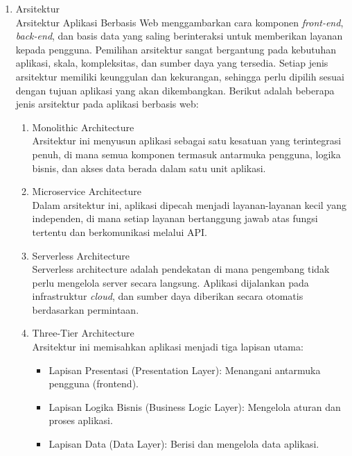 \begin{enumerate}[label*=\arabic*.,ref=\arabic*]
\begin{enumerate}[label=\alph*.]
        \end{enumerate}

    \item Arsitektur\\
        Arsitektur Aplikasi Berbasis Web menggambarkan cara komponen \textit{front-end}, \textit{back-end}, dan basis data yang saling berinteraksi untuk memberikan layanan kepada pengguna. Pemilihan arsitektur sangat bergantung pada kebutuhan aplikasi, skala, kompleksitas, dan sumber daya yang tersedia. Setiap jenis arsitektur memiliki keunggulan dan kekurangan, sehingga perlu dipilih sesuai dengan tujuan aplikasi yang akan dikembangkan. Berikut adalah beberapa jenis arsitektur pada aplikasi berbasis web:

        \begin{enumerate}[label=\alph*.]
            \item Monolithic Architecture\\
                Arsitektur ini menyusun aplikasi sebagai satu kesatuan yang terintegrasi penuh, di mana semua komponen termasuk antarmuka pengguna, logika bisnis, dan akses data berada dalam satu unit aplikasi.
                
            \item Microservice Architecture\\
                Dalam arsitektur ini, aplikasi dipecah menjadi layanan-layanan kecil yang independen, di mana setiap layanan bertanggung jawab atas fungsi tertentu dan berkomunikasi melalui API.
            
            \item Serverless Architecture\\
                Serverless architecture adalah pendekatan di mana pengembang tidak perlu mengelola server secara langsung. Aplikasi dijalankan pada infrastruktur \textit{cloud}, dan sumber daya diberikan secara otomatis berdasarkan permintaan.
            
            \item Three-Tier Architecture\\
                Arsitektur ini memisahkan aplikasi menjadi tiga lapisan utama:

                \begin{itemize}
                    \item Lapisan Presentasi (Presentation Layer): Menangani antarmuka pengguna (frontend).
                    \item Lapisan Logika Bisnis (Business Logic Layer): Mengelola aturan dan proses aplikasi.
                    \item Lapisan Data (Data Layer): Berisi dan mengelola data aplikasi.
                \end{itemize}
        \end{enumerate}
        

\end{enumerate}
